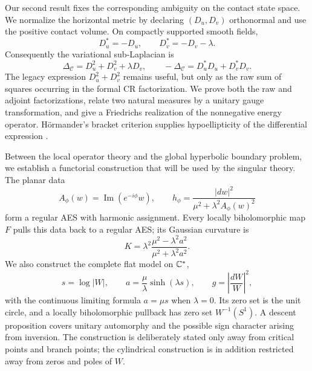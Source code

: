 Our second result fixes the corresponding ambiguity on the contact state space.
We normalize the horizontal metric by declaring $(D_u,D_v)$ orthonormal and use the
positive contact volume.  On compactly supported smooth fields,
\begin{equation}\label{eq:intro-contact-adjoints}
 D_u^*=-D_u,
 \qquad
 D_v^*=-D_v-\lambda.
\end{equation}
Consequently the variational sub-Laplacian is
\begin{equation}\label{eq:intro-contact-laplacian}
 \Delta_{\mathcal C}
 =D_u^2+D_v^2+\lambda D_v,
 \qquad
 -\Delta_{\mathcal C}=D_u^*D_u+D_v^*D_v.
\end{equation}
The legacy expression $D_u^2+D_v^2$ remains useful, but only as the raw sum of
squares occurring in the formal CR factorization.  We prove both the raw and adjoint
factorizations, relate two natural measures by a unitary gauge transformation, and
give a Friedrichs realization of the nonnegative energy operator.  H\"ormander's
bracket criterion supplies hypoellipticity of the differential expression
\cite{Hormander1967Hypoelliptic}.

Between the local operator theory and the global hyperbolic boundary problem, we
establish a functorial construction that will be used by the singular theory.  The
planar data
\[
 A_\phi(w)=\operatorname{Im}(e^{-i\phi}w),
 \qquad
 h_\phi=\frac{|dw|^2}{\mu^2+\lambda^2A_\phi(w)^2}
\]
form a regular AES with harmonic assignment.  Every locally biholomorphic map
\(F\) pulls this data back to a regular AES; its Gaussian curvature is
\[
 K=\lambda^2\frac{\mu^2-\lambda^2a^2}{\mu^2+\lambda^2a^2}.
\]
We also construct the complete flat model on \(\mathbb{C}^*\),
\[
 s=\log|W|,\qquad
 a=\frac{\mu}{\lambda}\sinh(\lambda s),
 \qquad
 g=\left|\frac{dW}{W}\right|^2,
\]
with the continuous limiting formula \(a=\mu s\) when \(\lambda=0\).  Its zero
set is the unit circle, and a locally biholomorphic pullback has zero set
\(W^{-1}(S^1)\).  A descent proposition covers unitary automorphy and the possible
sign character arising from inversion.  The construction is deliberately stated
only away from critical points and branch points; the cylindrical construction is
in addition restricted away from zeros and poles of $W$.

